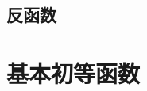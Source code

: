 \subsection{反函数}
\begin{exercise}

\end{exercise}
\section{基本初等函数}
\begin{exercise}

\end{exercise}
\begin{exercise*}

\end{exercise*}




\endinput
